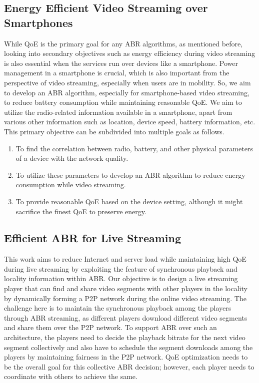 \subsection{Energy Efficient Video Streaming over Smartphones}
While \ac{QoE} is the primary goal for any \ac{ABR} algorithms, as mentioned before, looking into secondary objectives such as energy efficiency during video streaming is also essential when the services run over devices like a smartphone. Power management in a smartphone is crucial, which is also important from the perspective of video streaming, especially when users are in mobility. So, we aim to develop an \ac{ABR} algorithm, especially for smartphone-based video streaming, to reduce battery consumption while maintaining reasonable \ac{QoE}. We aim to utilize the radio-related information available in a smartphone, apart from various other information such as  location, device speed, battery information, etc. This primary objective can be subdivided into multiple goals as follows.
\begin{enumerate}
	\item To find the correlation between radio, battery, and other physical parameters of a device with the network quality.
	\item To utilize these parameters to develop an \ac{ABR} algorithm to reduce energy consumption while video streaming.
	\item To provide reasonable \ac{QoE} based on the device setting, although it might sacrifice the finest \ac{QoE} to preserve energy.
\end{enumerate}

\subsection{Efficient ABR for Live Streaming}
This work aims to reduce Internet and server load while maintaining high \ac{QoE} during live streaming by exploiting the feature of synchronous playback and locality information within \ac{ABR}. Our objective is to design a live streaming player that can find and share video segments with other players in the locality by dynamically forming a \ac{P2P} network during the online video streaming. The challenge here is to maintain the synchronous playback among the players through \ac{ABR} streaming, as different players download different video segments and share them over the \ac{P2P} network. To support \ac{ABR} over such an architecture, the players need to decide the playback bitrate for the next video segment collectively and also have to schedule the segment downloads among the players by maintaining fairness in the \ac{P2P} network. \ac{QoE} optimization needs to be the overall goal for this collective \ac{ABR} decision; however, each player needs to coordinate with others to achieve the same. 

